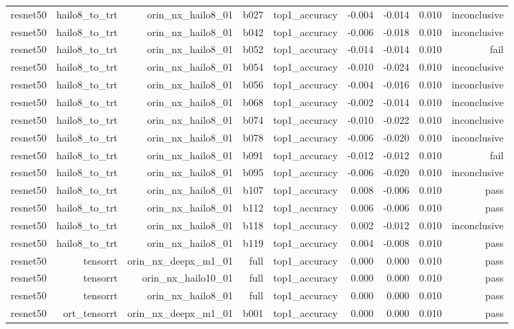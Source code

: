 \begin{table}[t]
\begin{tabular}{lrrrrrrrr}
resnet50 & hailo8\_to\_trt & orin\_nx\_hailo8\_01 & b027 & top1\_accuracy & -0.004 & -0.014 & 0.010 & inconclusive \\
resnet50 & hailo8\_to\_trt & orin\_nx\_hailo8\_01 & b042 & top1\_accuracy & -0.006 & -0.018 & 0.010 & inconclusive \\
resnet50 & hailo8\_to\_trt & orin\_nx\_hailo8\_01 & b052 & top1\_accuracy & -0.014 & -0.014 & 0.010 & fail \\
resnet50 & hailo8\_to\_trt & orin\_nx\_hailo8\_01 & b054 & top1\_accuracy & -0.010 & -0.024 & 0.010 & inconclusive \\
resnet50 & hailo8\_to\_trt & orin\_nx\_hailo8\_01 & b056 & top1\_accuracy & -0.004 & -0.016 & 0.010 & inconclusive \\
resnet50 & hailo8\_to\_trt & orin\_nx\_hailo8\_01 & b068 & top1\_accuracy & -0.002 & -0.014 & 0.010 & inconclusive \\
resnet50 & hailo8\_to\_trt & orin\_nx\_hailo8\_01 & b074 & top1\_accuracy & -0.010 & -0.022 & 0.010 & inconclusive \\
resnet50 & hailo8\_to\_trt & orin\_nx\_hailo8\_01 & b078 & top1\_accuracy & -0.006 & -0.020 & 0.010 & inconclusive \\
resnet50 & hailo8\_to\_trt & orin\_nx\_hailo8\_01 & b091 & top1\_accuracy & -0.012 & -0.012 & 0.010 & fail \\
resnet50 & hailo8\_to\_trt & orin\_nx\_hailo8\_01 & b095 & top1\_accuracy & -0.006 & -0.020 & 0.010 & inconclusive \\
resnet50 & hailo8\_to\_trt & orin\_nx\_hailo8\_01 & b107 & top1\_accuracy & 0.008 & -0.006 & 0.010 & pass \\
resnet50 & hailo8\_to\_trt & orin\_nx\_hailo8\_01 & b112 & top1\_accuracy & 0.006 & -0.006 & 0.010 & pass \\
resnet50 & hailo8\_to\_trt & orin\_nx\_hailo8\_01 & b118 & top1\_accuracy & 0.002 & -0.012 & 0.010 & inconclusive \\
resnet50 & hailo8\_to\_trt & orin\_nx\_hailo8\_01 & b119 & top1\_accuracy & 0.004 & -0.008 & 0.010 & pass \\
resnet50 & tensorrt & orin\_nx\_deepx\_m1\_01 & full & top1\_accuracy & 0.000 & 0.000 & 0.010 & pass \\
resnet50 & tensorrt & orin\_nx\_hailo10\_01 & full & top1\_accuracy & 0.000 & 0.000 & 0.010 & pass \\
resnet50 & tensorrt & orin\_nx\_hailo8\_01 & full & top1\_accuracy & 0.000 & 0.000 & 0.010 & pass \\
resnet50 & ort\_tensorrt & orin\_nx\_deepx\_m1\_01 & b001 & top1\_accuracy & 0.000 & 0.000 & 0.010 & pass \\

\end{tabular}
\end{table}
